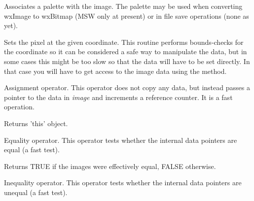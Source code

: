 
Associates a palette with the image. The palette may be used when converting
wxImage to wxBitmap (MSW only at present) or in file save operations (none as yet).

\label{wximagesetrgb}


Sets the pixel at the given coordinate. This routine performs bounds-checks
for the coordinate so it can be considered a safe way to manipulate the
data, but in some cases this might be too slow so that the data will have to
be set directly. In that case you will have to get access to the image data 
using the  method.



Assignment operator. This operator does not copy any data, but instead
passes a pointer to the data in {\it image} and increments a reference
counter. It is a fast operation.




Returns 'this' object.



Equality operator. This operator tests whether the internal data pointers are
equal (a fast test).




Returns TRUE if the images were effectively equal, FALSE otherwise.



Inequality operator. This operator tests whether the internal data pointers are
unequal (a fast test).

